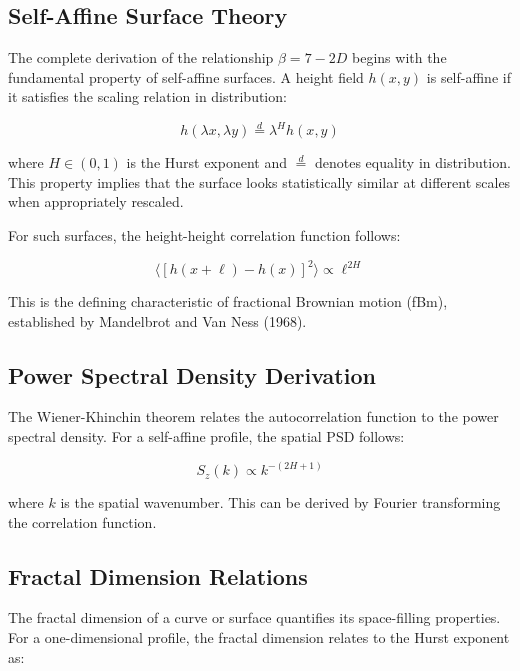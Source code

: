 \documentclass[11pt,letterpaper]{article}
\begin{document}
\subsection{Self-Affine Surface Theory}

The complete derivation of the relationship $\beta = 7-2D$ begins with the fundamental property of self-affine surfaces. A height field $h(x,y)$ is self-affine if it satisfies the scaling relation in distribution:

\begin{equation}
h(\lambda x, \lambda y) \stackrel{d}{=} \lambda^H h(x,y)
\end{equation}

where $H \in (0,1)$ is the Hurst exponent and $\stackrel{d}{=}$ denotes equality in distribution. This property implies that the surface looks statistically similar at different scales when appropriately rescaled.

For such surfaces, the height-height correlation function follows:

\begin{equation}
\langle [h(x+\ell) - h(x)]^2 \rangle \propto \ell^{2H}
\end{equation}

This is the defining characteristic of fractional Brownian motion (fBm), established by Mandelbrot and Van Ness (1968).

\subsection{Power Spectral Density Derivation}

The Wiener-Khinchin theorem relates the autocorrelation function to the power spectral density. For a self-affine profile, the spatial PSD follows:

\begin{equation}
S_z(k) \propto k^{-(2H+1)}
\end{equation}

where $k$ is the spatial wavenumber. This can be derived by Fourier transforming the correlation function.


\subsection{Fractal Dimension Relations}

The fractal dimension of a curve or surface quantifies its space-filling properties. For a one-dimensional profile, the fractal dimension relates to the Hurst exponent as:
\end{document}
